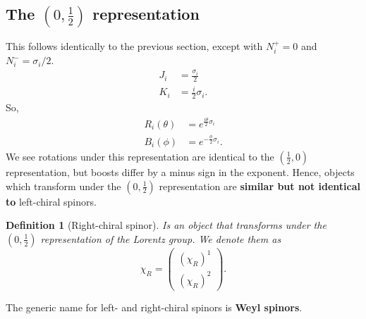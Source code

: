 \documentclass[11pt]{article}
\numberwithin{equation}{section}
\newtheorem{defn}{Definition}[section]
\begin{document}
\subsection{The $(0, \frac{1}{2})$ representation}
This follows identically to the previous section, except with $N_i^+=0$ and $N_i^- = \sigma_i/2$. 
\begin{align}
J_i &= \frac{\sigma_i}{2} \\
K_i &= \frac{i}{2} \sigma_i.
\end{align}
So,
\begin{align}
R_i(\theta) &= e^{\frac{i \theta}{2}  \sigma_i} \\
B_i(\phi) &= e^{-\frac{\phi}{2}  \sigma_i}.
\end{align}
We see rotations under this representation are identical to the $(\frac{1}{2},0)$ representation, but boosts differ by a minus sign in the exponent. Hence, objects which transform under the $(0, \frac{1}{2})$ representation are \textbf{similar but not identical to} left-chiral spinors.
\begin{defn}[Right-chiral spinor]
Is an object that transforms under the $(0, \frac{1}{2})$ representation of the Lorentz group. We denote them as 
\begin{equation}
\chi_R = \begin{pmatrix}
(\chi_R)^1 \\
(\chi_R)^2 
\end{pmatrix}.
\end{equation}
\end{defn}
\noindent The generic name for left- and right-chiral spinors is \textbf{Weyl spinors}.

\newpage
 
\end{document}
